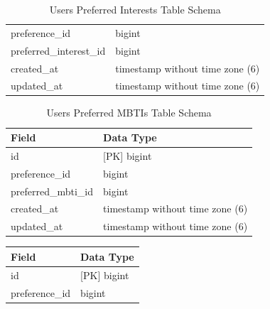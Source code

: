 \begin{enumerate}
\begin{table}[h!]
\begin{tabular}{ll}
    preference\_id               & bigint                             \\ 
    preferred\_interest\_id      & bigint                             \\ 
    created\_at                  & timestamp without time zone (6)    \\ 
    updated\_at                  & timestamp without time zone (6)    \\ \hline
    \end{tabular}
    \caption{Users Preferred Interests Table Schema}
    \label{tab:Users Preferred Interests Table Schema}
    \end{table}
    \vspace{0cm} %
    \begin{table}[h!]
    \captionsetup{justification=centering, singlelinecheck=false, labelsep=space}
    \centering
    \begin{tabular}{ll}
    \hline
    \textbf{Field}               & \textbf{Data Type}                 \\ \hline
    id                           & [PK] bigint                        \\ 
    preference\_id               & bigint                             \\ 
    preferred\_mbti\_id          & bigint                             \\ 
    created\_at                  & timestamp without time zone (6)    \\ 
    updated\_at                  & timestamp without time zone (6)    \\ \hline
    \end{tabular}
    \caption{Users Preferred MBTIs Table Schema}
    \label{tab:Users Preferred MBTIs Table Schema}
    \end{table}
    \vspace{2cm} %
    \begin{table}[h!]
    \captionsetup{justification=centering, singlelinecheck=false, labelsep=space}
    \centering
    \begin{tabular}{ll}
    \hline
    \textbf{Field}               & \textbf{Data Type}                 \\ \hline
    id                           & [PK] bigint                        \\ 
    preference\_id               & bigint                             \\ 

\end{tabular}
\end{table}
\end{enumerate}
